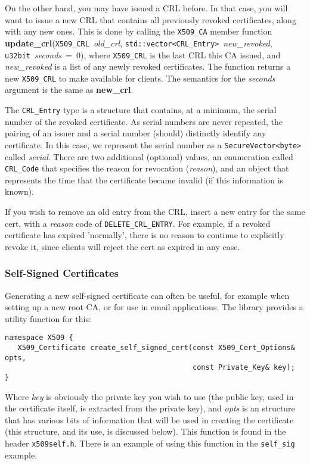 \documentclass{article}
\newcommand{\filename}[1]{\texttt{#1}}
\newcommand{\function}[1]{\textbf{#1}}
\newcommand{\type}[1]{\texttt{#1}}
\renewcommand{\arg}[1]{\textsl{#1}}
\begin{document}
On the other hand, you may have issued a CRL before. In that case, you will
want to issue a new CRL that contains all previously revoked
certificates, along with any new ones. This is done by calling the
\type{X509\_CA} member function
\function{update\_crl}(\type{X509\_CRL}~\arg{old\_crl},
\type{std::vector<CRL\_Entry>}~\arg{new\_revoked},
\type{u32bit}~\arg{seconds}~=~0), where \type{X509\_CRL} is the last CRL this
CA issued, and \arg{new\_revoked} is a list of any newly revoked certificates.
The function returns a new \type{X509\_CRL} to make available for clients. The
semantics for the \arg{seconds} argument is the same as \function{new\_crl}.

The \type{CRL\_Entry} type is a structure that contains, at a minimum, the
serial number of the revoked certificate. As serial numbers are never repeated,
the pairing of an issuer and a serial number (should) distinctly identify any
certificate. In this case, we represent the serial number as a
\type{SecureVector<byte>} called \arg{serial}. There are two additional
(optional) values, an enumeration called \type{CRL\_Code} that specifies the
reason for revocation (\arg{reason}), and an object that represents the time
that the certificate became invalid (if this information is known).

If you wish to remove an old entry from the CRL, insert a new entry for the
same cert, with a \arg{reason} code of \type{DELETE\_CRL\_ENTRY}. For example,
if a revoked certificate has expired 'normally', there is no reason to continue
to explicitly revoke it, since clients will reject the cert as expired in any
case.

\subsubsection{Self-Signed Certificates}

Generating a new self-signed certificate can often be useful, for
example when setting up a new root CA, or for use in email
applications. The library provides a utility function for this:

\begin{verbatim}
namespace X509 {
   X509_Certificate create_self_signed_cert(const X509_Cert_Options& opts,
                                            const Private_Key& key);
}
\end{verbatim}

Where \arg{key} is obviously the private key you wish to use (the public key,
used in the certificate itself, is extracted from the private key), and
\arg{opts} is an structure that has various bits of information that will be
used in creating the certificate (this structure, and its use, is discussed
below). This function is found in the header \filename{x509self.h}. There is an
example of using this function in the \filename{self\_sig} example.
\end{document}
